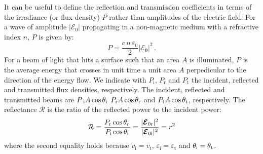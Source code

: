 \indent It can be useful to define the reflection and transmission coefficients in terms of the irradiance (or flux density) $P$ rather than amplitudes of the electric field. For a wave of amplitude $|\mathcal{E}_0|$ propagating in a non-magnetic medium with a refractive index $n$, $P$ is given by:
\begin{equation}
P = \frac{c\, n \, \varepsilon_0}{2}|\boldsymbol{\mathcal{E}_0}|^2 \,.
\end{equation}
For a beam of light that hits a surface such that an area $A$ is illuminated,
$P$ is the average energy that crosses in unit time a unit area $A$ perpedicular to the direction of the energy flow.
We indicate with $P_{\textrm{i}}$, $P_{\textrm{r}}$ and $P_{\textrm{t}}$ the incident, reflected and transmitted flux densities, respectively.
The incident, reflected and transmitted beams are 
$P_\textrm{
i} A\cos\theta_\textrm{i}$ $P_\textrm{r} A\cos\theta_\textrm{r}$ and 
$P_\textrm{t} A\cos\theta_\textrm{t}$, respectively. %
The reflectance $\mathcal{R}$ is the ratio of the reflected power to the incident power:
\begin{equation}\label{reflectance}
\mathcal{R} = \frac{P_\textrm{r}\cos\theta_r}{P_\textrm{i}\cos\theta_\textrm{i}} = \frac{|\boldsymbol{\mathcal{E}}_{0 \textrm{r}}|^2}{|\boldsymbol{\mathcal{E}}_{0 \textrm{i}}|^2} = r^2
\end{equation}
where the second equality holds because $v_{\textrm{i}}= v_{\textrm{t}}$, $\varepsilon_{\textrm{i}} = \varepsilon_{\textrm{t}}$ and $\theta_{\textrm{i}} = \theta_{\textrm{t}}$.
